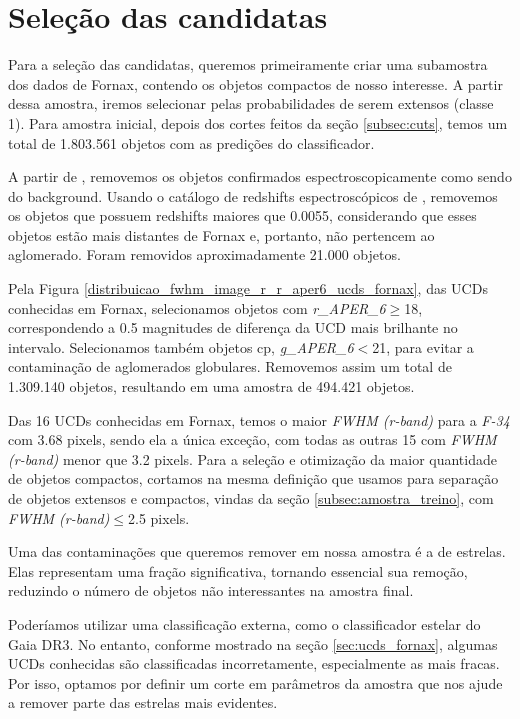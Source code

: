 \section{Seleção das candidatas}\label{cap:selecao_candidatas}
Para a seleção das candidatas, queremos primeiramente criar uma subamostra dos dados de Fornax, contendo os objetos compactos de nosso interesse. A partir dessa amostra, iremos selecionar pelas probabilidades de serem extensos (classe 1). Para amostra inicial, depois dos cortes feitos da seção \ref{subsec:cuts}, temos um total de 1.803.561 objetos com as predições do classificador. 

A partir de \cite{Su_2021}, removemos os objetos confirmados espectroscopicamente como sendo do background. Usando o catálogo de redshifts espectroscópicos de \cite{Lima_2024}, removemos os objetos que possuem redshifts maiores que 0.0055, considerando que esses objetos estão mais distantes de Fornax e, portanto, não pertencem ao aglomerado. Foram removidos aproximadamente 21.000 objetos.

Pela Figura \ref{distribuicao_fwhm_image_r_r_aper6_ucds_fornax}, das UCDs conhecidas em Fornax, selecionamos objetos com \textit{r\_APER\_6}$\geq$18, correspondendo a 0.5 magnitudes de diferença da UCD mais brilhante no intervalo. Selecionamos também objetos cp, \textit{g\_APER\_6}$<$21, para evitar a contaminação de aglomerados globulares. Removemos assim um total de 1.309.140 objetos, resultando em uma amostra de 494.421 objetos.

Das 16 UCDs conhecidas em Fornax, temos o maior \textit{FWHM (r-band)} para a \textit{F-34} com 3.68 pixels, sendo ela a única exceção, com todas as outras 15 com \textit{FWHM (r-band)} menor que 3.2 pixels. Para a seleção e otimização da maior quantidade de objetos compactos, cortamos na mesma definição que usamos para separação de objetos extensos e compactos, vindas da seção \ref{subsec:amostra_treino}, com \textit{FWHM (r-band)}$\leq$2.5 pixels.

Uma das contaminações que queremos remover em nossa amostra é a de estrelas. Elas representam uma fração significativa, tornando essencial sua remoção, reduzindo o número de objetos não interessantes na amostra final.

Poderíamos utilizar uma classificação externa, como o classificador estelar do Gaia DR3. No entanto, conforme mostrado na seção \ref{sec:ucds_fornax}, algumas UCDs conhecidas são classificadas incorretamente, especialmente as mais fracas. Por isso, optamos por definir um corte em parâmetros da amostra que nos ajude a remover parte das estrelas mais evidentes.

